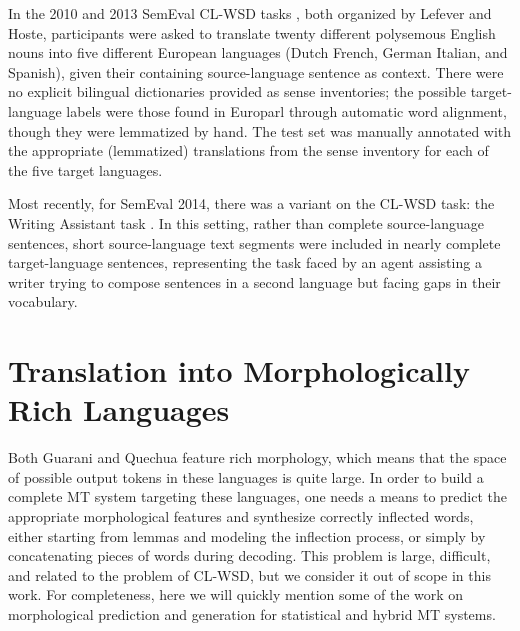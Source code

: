 In the 2010 and 2013 SemEval CL-WSD tasks
\cite{lefever-hoste:2010:SemEval,task10}, both organized by Lefever and Hoste,
participants were asked to translate twenty different polysemous English nouns
into five different European languages (Dutch French, German Italian, and
Spanish), given their containing source-language sentence as context. There
were no explicit bilingual dictionaries provided as sense inventories; the
possible target-language labels were those found in Europarl \cite{europarl}
through automatic word alignment, though they were lemmatized by hand. The test
set was manually annotated with the appropriate (lemmatized) translations from
the sense inventory for each of the five target languages.

Most recently, for SemEval 2014, there was a variant on the CL-WSD task: the
Writing Assistant task \cite{vangompel-EtAl:2014:SemEval}. In this setting,
rather than complete source-language sentences, short source-language text
segments were included in nearly complete target-language sentences,
representing the task faced by an agent assisting a writer trying to compose
sentences in a second language but facing gaps in their vocabulary.

\section{Translation into Morphologically Rich Languages}
Both Guarani and Quechua feature rich morphology, which means that the space of
possible output tokens in these languages is quite large. In order to build a
complete MT system targeting these languages, one needs a means to predict the
appropriate morphological features and synthesize correctly inflected words,
either starting from lemmas and modeling the inflection process, or simply by
concatenating pieces of words during decoding. This problem is large,
difficult, and related to the problem of CL-WSD, but we consider it out of
scope in this work. For completeness, here we will quickly mention some of the
work on morphological prediction and generation for statistical and hybrid MT
systems.

